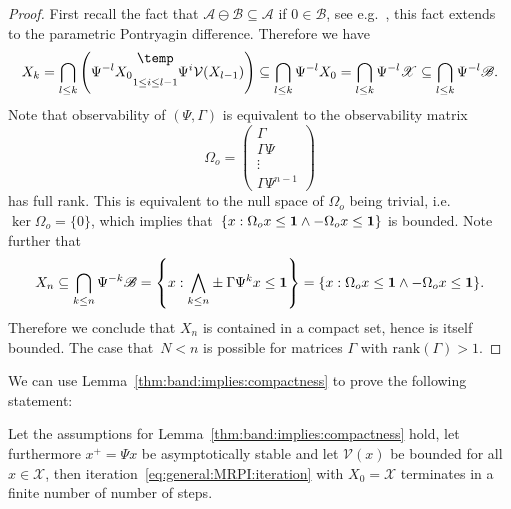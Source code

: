 \begin{proof}
First recall the fact that $\mathcal A\ominus \mathcal B\subseteq\mathcal A$ if $0\in\mathcal B$,
see e.g.~\cite{blanchini:2007}, this fact extends to the parametric Pontryagin difference.
%
Therefore we have
%
\begin{equation}
	X_k= \bigcap_{l\leq k}\left(\Psi^{-l} X_0 \underset{1\leq i\leq l-1}{\bigominus} 
	\Psi^{i}\mathcal V(X_{l-1}) \right) \subseteq \bigcap_{l\leq k} \Psi^{-l} X_0
	= \bigcap_{l\leq k} \Psi^{-l}\mathscr X \subseteq \bigcap_{l\leq k} \Psi^{-l} \mathscr B.
\end{equation}
%
Note that observability of $(\Psi,\Gamma)$ is equivalent to the observability matrix
\[
	\Omega_o = \left(\begin{array}{c}
	\Gamma \\ \Gamma \Psi \\ \vdots \\ \Gamma \Psi^{n-1}
	\end{array}\right)
\]
%
has full rank.
%
This is equivalent to the null space of $\Omega_o$ being trivial, i.e.~$\ker\Omega_o=\{0\}$,
which implies that~$\{x: \Omega_o x \leq {\bf{1}} \wedge -\Omega_o x \leq {\bf{1}}\}$ is bounded.
%
Note further that
\begin{equation}
	X_n \subseteq \bigcap_{k\leq n} \Psi^{-k}\mathscr B = \left\{x:\underset{k\leq n}{\bigwedge} 
	\pm \Gamma\Psi^{k}x\leq{\bf{1}} \right\} =\{x: \Omega_o x \leq {\bf{1}}\wedge -\Omega_o x\leq{\bf{1}} \}.
\end{equation}
%
Therefore we conclude that $X_n$ is contained in a compact set, hence is itself bounded.
%
The case that~$N<n$ is possible for matrices $\Gamma$ with $\text{rank}(\Gamma)>1$.
\end{proof}
%
We can use Lemma~\ref{thm:band:implies:compactness} to prove the following statement:
%
\begin{thm}
\label{thm:finite:terminability:MRPI:algorithm}
Let the assumptions for Lemma~\ref{thm:band:implies:compactness} hold, let furthermore
$x^+=\Psi x$ be asymptotically stable and let $\mathcal V(x)$ be bounded for all $x\in\mathscr X$, 
then iteration~\eqref{eq:general:MRPI:iteration} with $X_0=\mathscr X$ terminates in a finite 
number of number of steps.
\end{thm}
